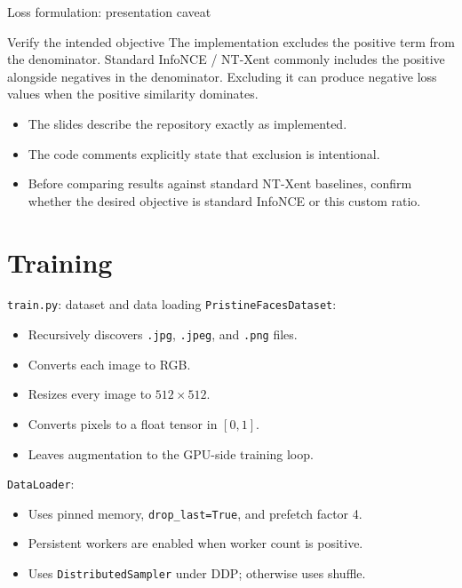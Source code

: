 \documentclass[aspectratio=169,10pt]{beamer}
\newcommand{\file}[1]{\texttt{#1}}
\newcommand{\code}[1]{\texttt{#1}}
\begin{document}
\begin{frame}{Loss formulation: presentation caveat}
  \begin{alertblock}{Verify the intended objective}
    The implementation excludes the positive term from the denominator. Standard
    InfoNCE / NT-Xent commonly includes the positive alongside negatives in the
    denominator. Excluding it can produce negative loss values when the positive
    similarity dominates.
  \end{alertblock}
  \begin{itemize}
    \item The slides describe the repository exactly as implemented.
    \item The code comments explicitly state that exclusion is intentional.
    \item Before comparing results against standard NT-Xent baselines, confirm
          whether the desired objective is standard InfoNCE or this custom ratio.
  \end{itemize}
\end{frame}

\section{Training}

\begin{frame}{\file{train.py}: dataset and data loading}
  \code{PristineFacesDataset}:
  \begin{itemize}
    \item Recursively discovers \code{.jpg}, \code{.jpeg}, and \code{.png} files.
    \item Converts each image to RGB.
    \item Resizes every image to $512\times512$.
    \item Converts pixels to a float tensor in $[0,1]$.
    \item Leaves augmentation to the GPU-side training loop.
  \end{itemize}
  \code{DataLoader}:
  \begin{itemize}
    \item Uses pinned memory, \code{drop\_last=True}, and prefetch factor 4.
    \item Persistent workers are enabled when worker count is positive.
    \item Uses \code{DistributedSampler} under DDP; otherwise uses shuffle.
  \end{itemize}
\end{frame}
\end{document}

